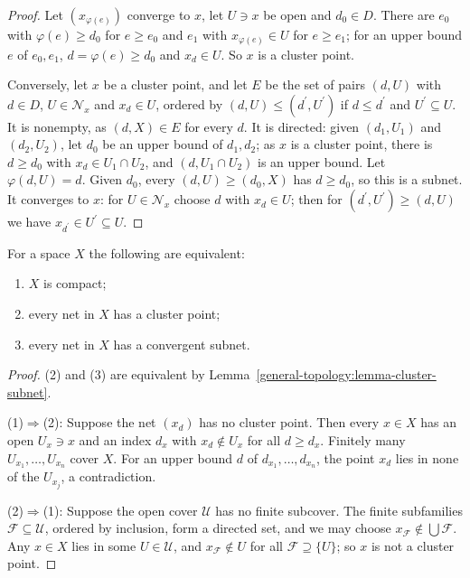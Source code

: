 \begin{proof}
Let $(x_{\varphi(e)})$ converge to $x$, let $U \ni x$ be open and $d_0 \in D$. There are $e_0$ with $\varphi(e) \geq d_0$ for $e \geq e_0$ and $e_1$ with $x_{\varphi(e)} \in U$ for $e \geq e_1$; for an upper
bound $e$ of $e_0, e_1$, $d = \varphi(e) \geq d_0$ and $x_d \in U$. So $x$ is a cluster point.

Conversely, let $x$ be a cluster point, and let $E$ be the set of pairs $(d, U)$ with $d \in D$, $U \in \mathcal{N}_x$ and $x_d \in U$, ordered by $(d, U) \leq (d^{\prime}, U^{\prime})$ if $d \leq d^{\prime}$ and
$U^{\prime} \subseteq U$. It is nonempty, as $(d, X) \in E$ for every $d$. It is directed: given $(d_1, U_1)$ and $(d_2, U_2)$, let $d_0$ be an upper bound of $d_1, d_2$; as $x$ is a cluster point, there is
$d \geq d_0$ with $x_d \in U_1 \cap U_2$, and $(d, U_1 \cap U_2)$ is an upper bound. Let $\varphi(d, U) = d$. Given $d_0$, every $(d, U) \geq (d_0, X)$ has $d \geq d_0$, so this is a subnet. It converges to $x$:
for $U \in \mathcal{N}_x$ choose $d$ with $x_d \in U$; then for $(d^{\prime}, U^{\prime}) \geq (d, U)$ we have $x_{d^{\prime}} \in U^{\prime} \subseteq U$.
\end{proof}

\begin{theorem}\label{general-topology:theorem-compact-nets}
For a space $X$ the following are equivalent:
\begin{enumerate}
\item $X$ is compact;
\item every net in $X$ has a cluster point;
\item every net in $X$ has a convergent subnet.
\end{enumerate}
\end{theorem}

\begin{proof}
(2) and (3) are equivalent by Lemma~\ref{general-topology:lemma-cluster-subnet}.

(1)$\Rightarrow$(2): Suppose the net $(x_d)$ has no cluster point. Then every $x \in X$ has an open $U_x \ni x$ and an index $d_x$ with $x_d \notin U_x$ for all $d \geq d_x$. Finitely many
$U_{x_1}, \ldots, U_{x_n}$ cover $X$. For an upper bound $d$ of $d_{x_1}, \ldots, d_{x_n}$, the point $x_d$ lies in none of the $U_{x_j}$, a contradiction.

(2)$\Rightarrow$(1): Suppose the open cover $\mathcal{U}$ has no finite subcover. The finite subfamilies $\mathcal{F} \subseteq \mathcal{U}$, ordered by inclusion, form a directed set, and we may choose
$x_{\mathcal{F}} \notin \bigcup\mathcal{F}$. Any $x \in X$ lies in some $U \in \mathcal{U}$, and $x_{\mathcal{F}} \notin U$ for all $\mathcal{F} \supseteq \{U\}$; so $x$ is not a cluster point.
\end{proof}

